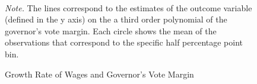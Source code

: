 \documentclass[dv_diss_main.tex]{subfiles}
\begin{document}
\begin{figure}[h]
	\begin{center}
	
        \\
        \caption{Growth Rate of Wages and Governor's Vote Margin}\label{fig:rddplotwages}
	\end{center}
	\vspace{0.5em}
    \begin{figurenotes}
    {\footnotesize	
	\textit{Note. }The lines correspond to the estimates of the outcome variable  (defined in the y axis) on the a third order polynomial of the governor's vote margin. Each circle shows the mean of the observations that correspond to the specific half percentage point bin. }
	\end{figurenotes}

\end{figure}
\end{document}
